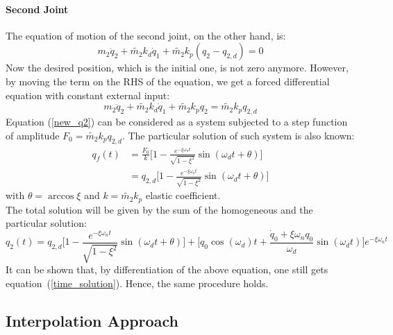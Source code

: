 \documentclass[a4paper,12pt,oneside]{report}
\begin{document}
\paragraph{Second Joint}
The equation of motion of the second joint, on the other hand, is:
\begin{equation}
  m_2\ddot{q}_2+\tilde{m_2}k_d\dot{q}_1+\tilde{m_2}k_p (q_2-q_{2,d})=0
\end{equation}
Now the desired position, which is the initial one, is not zero anymore. However, by moving the term on the RHS of the equation, we get a forced differential equation with constant external input:
\begin{equation}
  m_2\ddot{q}_2+\tilde{m_2}k_d\dot{q}_1+\tilde{m_2}k_p q_2=\tilde{m_2}k_pq_{2,d}
  \label{new_q2}
\end{equation}
Equation (\ref{new_q2}) can be considered as a system subjected to a step function of amplitude $F_0=\tilde{m_2}k_pq_{2,d}$. The particular solution of such system is also known:
\begin{equation}
  \begin{split}
  q_f(t)&=\frac{F_0}{k}\Big[1-\frac{e^{-\xi\omega_nt}}{\sqrt{1-\xi^2}}\sin{(\omega_dt+\theta)}\Big]\\
  &=q_{2,d}\Big[1-\frac{e^{-\xi\omega_nt}}{\sqrt{1-\xi^2}}\sin{(\omega_dt+\theta)}\Big]
\end{split}
\end{equation}
with $\theta=\arccos{\xi}$ and $k=\tilde{m_2}k_p$ elastic coefficient.\\
The total solution will be given by the sum of the homogeneous and the particular solution:
\begin{equation}
  q_2(t)=q_{2,d}\Big[1-\frac{e^{-\xi\omega_nt}}{\sqrt{1-\xi^2}}\sin{(\omega_dt+\theta)}\Big]+\Big[q_0\cos{(\omega_d)t}+\frac{\dot{q}_0+\xi\omega_n q_0}{\omega_d}\sin{(\omega_dt)}\Big]e^{-\xi \omega_n t}
\end{equation}
It can be shown that, by differentiation of the above equation, one still gets equation~(\ref{time_solution}).
Hence, the same procedure holds.
\newpage
\subsection{Interpolation Approach}
\end{document}
